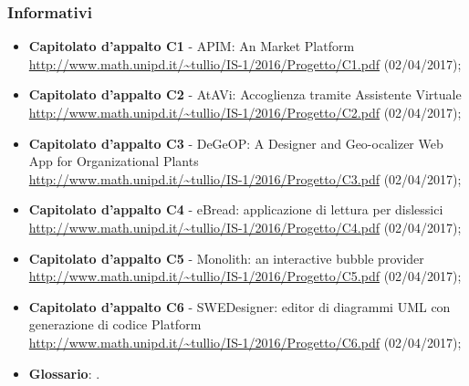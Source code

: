\documentclass[../StudiodiFattibilita.tex]{subfiles}
\begin{document}
			\subsubsection{Informativi}
			\begin{itemize}
				\item \textbf{Capitolato d'appalto C1} - APIM: An  Market Platform\\
				\url{http://www.math.unipd.it/~tullio/IS-1/2016/Progetto/C1.pdf} (02/04/2017);
				\item \textbf{Capitolato d'appalto C2} - AtAVi: Accoglienza tramite Assistente Virtuale\\
				\url{http://www.math.unipd.it/~tullio/IS-1/2016/Progetto/C2.pdf} (02/04/2017);
				\item \textbf{Capitolato d'appalto C3} - DeGeOP: A Designer and Geo-ocalizer Web App for Organizational Plants\\ 
				\url{http://www.math.unipd.it/~tullio/IS-1/2016/Progetto/C3.pdf} (02/04/2017);
				\item \textbf{Capitolato d'appalto C4} - eBread: applicazione di lettura per dislessici \\
				\url{http://www.math.unipd.it/~tullio/IS-1/2016/Progetto/C4.pdf} (02/04/2017);
				\item \textbf{Capitolato d'appalto C5} - Monolith: an interactive bubble provider\\
				\url{http://www.math.unipd.it/~tullio/IS-1/2016/Progetto/C5.pdf} (02/04/2017);
				\item \textbf{Capitolato d'appalto C6} - SWEDesigner: editor di diagrammi UML con generazione di codice Platform\\
				\url{http://www.math.unipd.it/~tullio/IS-1/2016/Progetto/C6.pdf} (02/04/2017);
				\item \textbf{Glossario}: \glossariov.
			\end{itemize}
\end{document}
